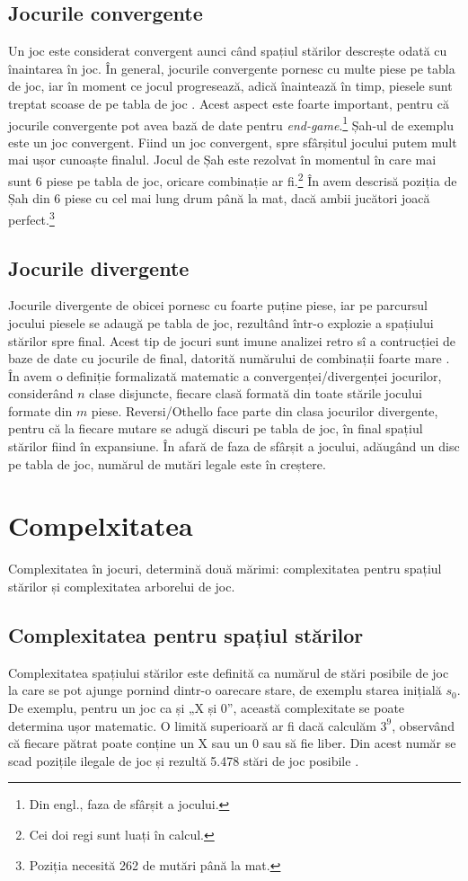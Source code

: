 \documentclass[12pt,twoside,a4paper,fleqn]{book}
\begin{document}
\subsection{Jocurile convergente}
Un joc este considerat convergent aunci când spațiul stărilor descrește odată cu înaintarea în joc. În general, jocurile convergente pornesc cu multe piese pe tabla de joc, iar în moment ce jocul progresează, adică înaintează în timp, piesele sunt treptat scoase de pe tabla de joc \cite{games_solved_herik}. Acest aspect este foarte important, pentru că jocurile convergente pot avea bază de date pentru \emph{end-game}.\footnote{Din engl., faza de sfârșit a jocului.} Șah-ul de exemplu este un joc convergent. Fiind un joc convergent, spre sfârșitul jocului putem mult mai ușor cunoaște finalul. Jocul de Șah este rezolvat în momentul în care mai sunt 6 piese pe tabla de joc, oricare combinație ar fi.\footnote{Cei doi regi sunt luați în calcul.} În \cite{games_solved_herik} avem descrisă poziția de Șah din 6 piese cu cel mai lung drum până la mat, dacă ambii jucători joacă perfect.\footnote{Poziția necesită 262 de mutări până la mat.}
\subsection{Jocurile divergente}
Jocurile divergente de obicei pornesc cu foarte puține piese, iar pe parcursul jocului piesele se adaugă pe tabla de joc, rezultând într-o explozie a spațiului stărilor spre final. Acest tip de jocuri sunt imune analizei retro sî a contrucției de baze de date cu jocurile de final, datorită numărului de combinații foarte mare \cite{games_solved_herik}. În \cite{allis} avem o definiție formalizată matematic a convergenței/divergenței jocurilor, considerând $n$ clase disjuncte, fiecare clasă formată din toate stările jocului formate din $m$ piese. Reversi/Othello face parte din clasa jocurilor divergente, pentru că la fiecare mutare se adugă discuri pe tabla de joc, în final spațiul stărilor fiind în expansiune. În afară de faza de sfârșit a jocului, adăugând un disc pe tabla de joc, numărul de mutări legale este în creștere.

\section{Compelxitatea}
Complexitatea în jocuri, determină două mărimi: complexitatea pentru spațiul stărilor și complexitatea arborelui de joc.
\subsection{Complexitatea pentru spațiul stărilor}
Complexitatea spațiului stărilor este definită ca numărul de stări posibile de joc la care se pot ajunge pornind dintr-o oarecare stare, de exemplu starea inițială $s_{0}$. De exemplu, pentru un joc ca și „X și 0”, această complexitate se poate determina ușor matematic. O limită superioară ar fi dacă calculăm $3^{9}$, observând că fiecare pătrat poate conține un X sau un 0 sau să fie liber. Din acest număr se scad pozițile ilegale de joc și rezultă 5.478 stări de joc posibile \cite{allis}.
\end{document}
